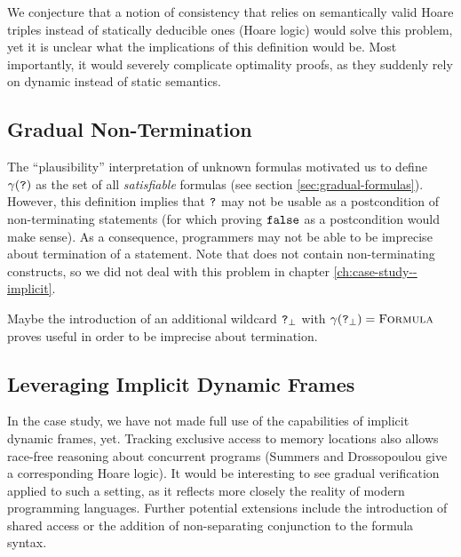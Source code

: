 \begin{comment}
INTERESTING! Regarding “when does optimal det. lift. imply opt. pred. lift.”
For above example, the gradual formula syntax would have to provide a way of saying that there is NOT MORE knowledge about x hidden in ?.
This way, the gradual implication of x = 4 would (as expected) fail, as the optimal predicate would
\end{comment}

We conjecture that a notion of consistency that relies on semantically valid Hoare triples instead of statically deducible ones (Hoare logic) would solve this problem, yet it is unclear what the implications of this definition would be.
Most importantly, it would severely complicate optimality proofs, as they suddenly rely on dynamic instead of static semantics.

\subsection{Gradual Non-Termination}%
The “plausibility” interpretation of unknown formulas motivated us to define $\gamma(\textup{\texttt{?}})$ as the set of all \emph{satisfiable} formulas \setFormulaA (see section \ref{sec:gradual-formulas}).
However, this definition implies that $\textup{\texttt{?}}$ may not be usable as a postcondition of non-terminating statements (for which proving $\textup{\texttt{false}}$ as a postcondition would make sense).
As a consequence, programmers may not be able to be imprecise about termination of a statement.
Note that \svlidf does not contain non-terminating constructs, so we did not deal with this problem in chapter \ref{ch:case-study--implicit}.

Maybe the introduction of an additional wildcard $\textup{\texttt{?}}_{\bot}$ with $\gamma(\textup{\texttt{?}}_{\bot}) = \textup{\textsc{Formula}}$ proves useful in order to be imprecise about termination.

\subsection{Leveraging Implicit Dynamic Frames}%
In the case study, we have not made full use of the capabilities of implicit dynamic frames, yet.
Tracking exclusive access to memory locations also allows race-free reasoning about concurrent programs (Summers and Drossopoulou \cite{summers2013formal} give a corresponding Hoare logic).
It would be interesting to see gradual verification applied to such a setting, as it reflects more closely the reality of modern programming languages.
Further potential extensions include the introduction of shared access or the addition of non-separating conjunction to the formula syntax.

